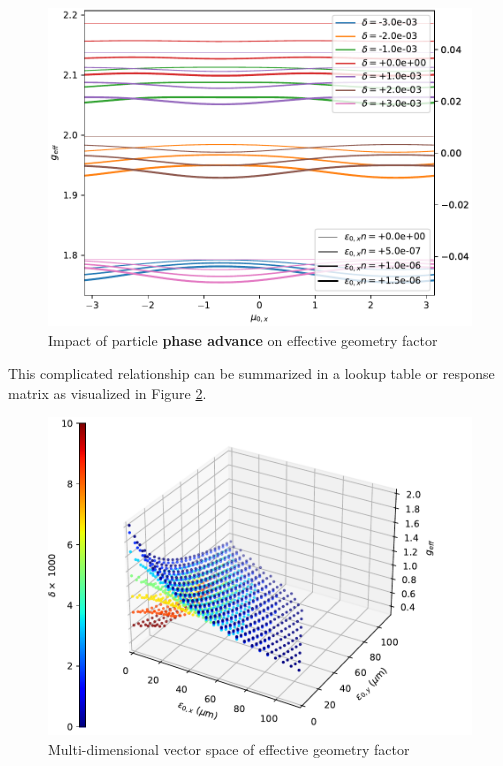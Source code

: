 \begin{figure}
    \centering
    \includegraphics{figs/g_phase_advance.pdf}
    \caption{Impact of particle \textbf{phase advance} on effective geometry factor}
    \label{fig:g_phase_advance}
\end{figure}

This complicated relationship can be summarized in a lookup table or response matrix as visualized in Figure \ref{fig:g_eff_vol}.

\begin{figure}
    \centering
    \includegraphics{figs/g_eff.surface.0.pdf}
    \caption{Multi-dimensional vector space of effective geometry factor}
    \label{fig:g_eff_vol}
\end{figure}

